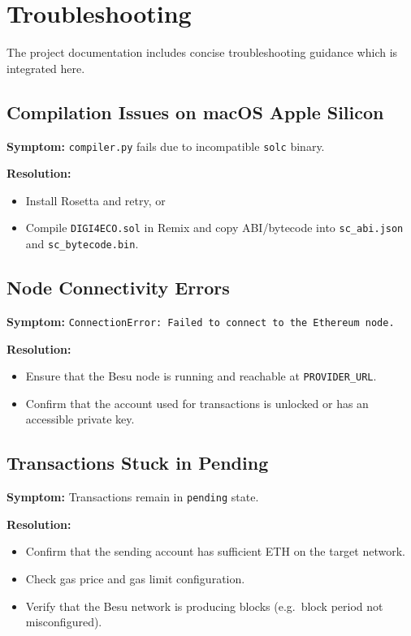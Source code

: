 \documentclass[11pt,a4paper]{article}
\begin{document}
\section{Troubleshooting}

The project documentation includes concise troubleshooting guidance which is integrated here.

\subsection{Compilation Issues on macOS Apple Silicon}

\textbf{Symptom:} \texttt{compiler.py} fails due to incompatible \texttt{solc} binary.

\textbf{Resolution:}

\begin{itemize}[noitemsep]
  \item Install Rosetta and retry, or
  \item Compile \texttt{DIGI4ECO.sol} in Remix and copy ABI/bytecode into \texttt{sc\_abi.json} and \texttt{sc\_bytecode.bin}.
\end{itemize}

\subsection{Node Connectivity Errors}

\textbf{Symptom:} \texttt{ConnectionError: Failed to connect to the Ethereum node.}

\textbf{Resolution:}

\begin{itemize}[noitemsep]
  \item Ensure that the Besu node is running and reachable at \texttt{PROVIDER\_URL}.
  \item Confirm that the account used for transactions is unlocked or has an accessible private key.
\end{itemize}

\subsection{Transactions Stuck in Pending}

\textbf{Symptom:} Transactions remain in \texttt{pending} state.

\textbf{Resolution:}

\begin{itemize}[noitemsep]
  \item Confirm that the sending account has sufficient ETH on the target network.
  \item Check gas price and gas limit configuration.
  \item Verify that the Besu network is producing blocks (e.g.\ block period not misconfigured).
\end{itemize}
\end{document}
